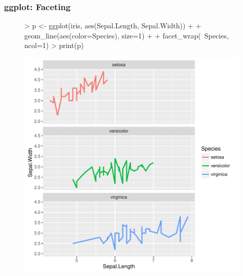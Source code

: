 \documentclass{beamer}
\begin{document}
\begin{frame}[containsverbatim]  
	\frametitle{ggplot: Faceting}
\scriptsize 
\begin{figure}
  \centering
\begin{Schunk}
\begin{Sinput}
> p <- ggplot(iris, aes(Sepal.Length, Sepal.Width)) + 
+ 	    geom_line(aes(color=Species), size=1) + 
+             facet_wrap(~Species, ncol=1)
> print(p) 
\end{Sinput}
\end{Schunk}
\includegraphics{fig--049}
\label{fig:qplotscatter}
\end{figure}
\end{frame}
\end{document}
